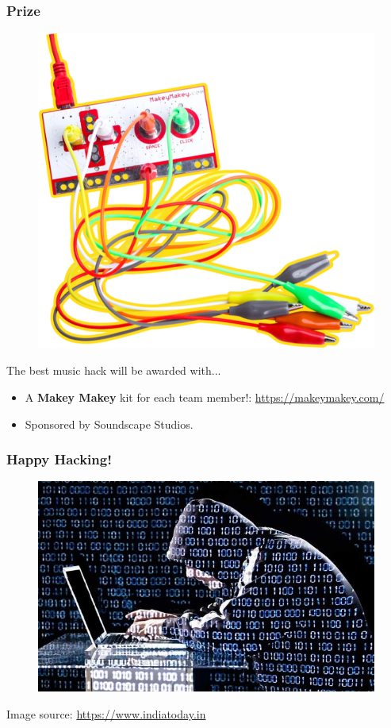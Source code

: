 \documentclass[screen, aspectratio=169]{beamer}
\begin{document}
\begin{frame}
  \frametitle{Prize}
  \begin{figure}
	\includegraphics[scale=0.1]{img/makey-makey.png}
  \end{figure}
  The best music hack will be awarded with...
    \begin{itemize}
    	\item A \textbf{Makey Makey} kit for each team member!: \url{https://makeymakey.com/}
	\item Sponsored by Soundscape Studios.
    \end{itemize}
\end{frame}
%
\begin{frame}
  \frametitle{Happy Hacking!}
    \begin{figure}
	\includegraphics[scale=0.3]{img/ethical-hacking.jpg}
    \end{figure}	
    {\tiny Image source: \url{https://www.indiatoday.in}}
\end{frame}
%
\end{document}
